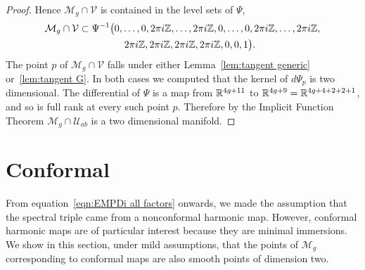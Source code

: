 \documentclass{article}
\begin{document}
\begin{thm}
\begin{proof}
Hence $\mathcal{M}_g \cap \mathcal{V}$ is contained in the level sets of $\Psi$,
\begin{align*}
\mathcal{M}_g \cap \mathcal{V}
\subset \Psi^{-1}\big( &0,\dots,0,2\pi i\mathbb{Z},\dots,2\pi i\mathbb{Z},0,\dots,0,2\pi i\mathbb{Z},\dots,2\pi i\mathbb{Z}, \\
&\quad 2\pi i\mathbb{Z},2\pi i\mathbb{Z},2\pi i\mathbb{Z},2\pi i\mathbb{Z},0,0,1 \big).
\end{align*}
The point $p$ of $\mathcal{M}_g \cap \mathcal{V}$ falls under either Lemma~\ref{lem:tangent generic} or~\ref{lem:tangent G}. In both cases we computed that the kernel of $d\Psi_p$ is two dimensional. The differential of $\Psi$ is a map from $\mathbb{R}^{4g+11}$ to $\mathbb{R}^{4g+9} = \mathbb{R}^{4g+4+2+2+1}$, and so is full rank at every such point $p$. Therefore by the Implicit Function Theorem $\mathcal{M}_g \cap \mathcal{U}_{ab}$ is a two dimensional manifold.
\end{proof}
\end{thm}




\section{Conformal}\label{sec:conformal}

From equation~\eqref{eqn:EMPDi all factors} onwards, we made the assumption that the spectral triple came from a nonconformal harmonic map. However, conformal harmonic maps are of particular interest because they are minimal immersions. We show in this section, under mild assumptions, that the points of $\mathcal{M}_g$ corresponding to conformal maps are also smooth points of dimension two. 
\end{document}
